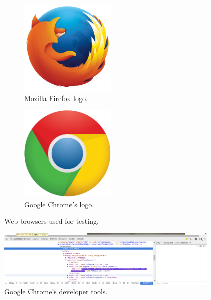 \begin{figure}[!htbp]
	\centering
	\begin{subfigure}{0.45\textwidth}
		\centering
		\includegraphics[width=0.5\textwidth]{fig/firefox}
		\caption{Mozilla Firefox logo.}\label{subfig:firefox}
	\end{subfigure}\quad
	\begin{subfigure}{0.45\textwidth}
		\centering
		\includegraphics[width=0.5\textwidth]{fig/chrome}
		\caption{Google Chrome's logo.}\label{subfig:chrome}
	\end{subfigure}\quad
	\caption{Web browsers used for testing.}
\end{figure}

\begin{figure}[!htbp]
	\centering
	\includegraphics[width=0.95\textwidth]{fig/chrome-dev}
	\caption{Google Chrome's developer tools.}
	\label{fig:chrome_dev}
\end{figure}


